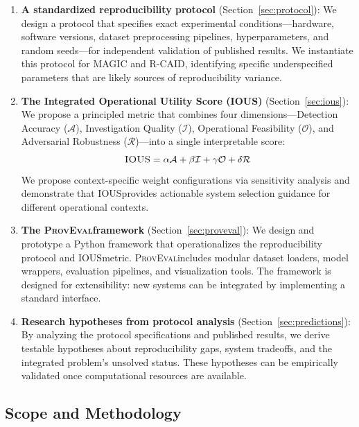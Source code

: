 \documentclass[11pt,a4paper]{article}
\newcommand{\system}[1]{\textsc{#1}}
\newcommand{\ious}{\textsc{IOUS}}
\newcommand{\proveval}{\textsc{ProvEval}}
\begin{document}
\begin{enumerate}[leftmargin=*]
    \item \textbf{A standardized reproducibility protocol} (Section~\ref{sec:protocol}): We design a protocol that specifies exact experimental conditions---hardware, software versions, dataset preprocessing pipelines, hyperparameters, and random seeds---for independent validation of published results. We instantiate this protocol for \system{MAGIC} and \system{R-CAID}, identifying specific underspecified parameters that are likely sources of reproducibility variance.

    \item \textbf{The Integrated Operational Utility Score (\ious)} (Section~\ref{sec:ious}): We propose a principled metric that combines four dimensions---Detection Accuracy ($\mathcal{A}$), Investigation Quality ($\mathcal{I}$), Operational Feasibility ($\mathcal{O}$), and Adversarial Robustness ($\mathcal{R}$)---into a single interpretable score:
    \begin{equation}
    \textsc{IOUS} = \alpha \mathcal{A} + \beta \mathcal{I} + \gamma \mathcal{O} + \delta \mathcal{R}
    \end{equation}
    We propose context-specific weight configurations via sensitivity analysis and demonstrate that \ious provides actionable system selection guidance for different operational contexts.

    \item \textbf{The \proveval framework} (Section~\ref{sec:proveval}): We design and prototype a Python framework that operationalizes the reproducibility protocol and \ious metric. \proveval includes modular dataset loaders, model wrappers, evaluation pipelines, and visualization tools. The framework is designed for extensibility: new systems can be integrated by implementing a standard interface.

    \item \textbf{Research hypotheses from protocol analysis} (Section~\ref{sec:predictions}): By analyzing the protocol specifications and published results, we derive testable hypotheses about reproducibility gaps, system tradeoffs, and the integrated problem's unsolved status. These hypotheses can be empirically validated once computational resources are available.
\end{enumerate}

\subsection{Scope and Methodology}
\end{document}
